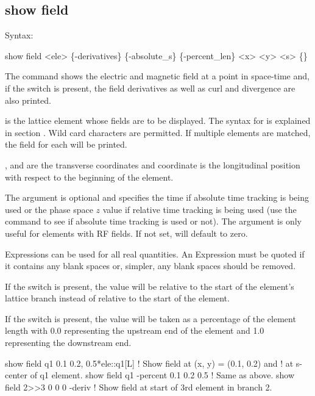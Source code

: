 {{{{{{{{%

\subsection{show field}
\label{s:show.field}

Syntax:
\begin{example}
  show field <ele> \{-derivatives\} \{-absolute_s\} \{-percent_len\} <x> <y> <s> \{<t-or-z>\}
\end{example}

The  command shows the electric and magnetic field at a point in space-time and, if
the  switch is present, the field derivatives as well as curl and divergence are
also printed.

 is the lattice element whose fields are to be displayed. The syntax for  is
explained in section . Wild card characters are permitted. If multiple
elements are matched, the field for each will be printed.

, and  are the transverse coordinates and  coordinate is the longitudinal
position with respect to the beginning of the element. 

The  argument is optional and specifies the time if absolute time tracking is being
used or the phase space $z$ value if relative time tracking is being used (use the  command to see if absolute time tracking is used or not). The  argument is
only useful for elements with RF fields. If not set,  will default to zero.

Expressions can be used for all real quantities. An Expression must be quoted if it contains any
blank spaces or, simpler, any blank spaces should be removed.

If the  switch is present, the  value will be relative to the start
of the element's lattice branch instead of relative to the start of the element.

If the  switch is present, the  value will be taken as a percentage
of the element length with 0.0 representing the upstream end of the element and 1.0 representing
the downstream end.

\begin{example}
  show field q1 0.1  0.2, 0.5*ele::q1[L]  ! Show field at (x, y) = (0.1, 0.2) and 
                                          !    at s-center of q1 element.
  show field q1 -percent 0.1  0.2 0.5     ! Same as above.
  show field 2>>3 0 0 0 -deriv            ! Show field at start of 3rd element in branch 2.
\end{example}

}}}}}}}}
